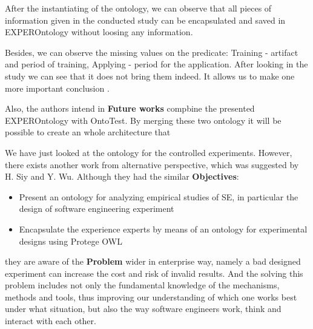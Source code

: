 	 After the instantiating of the ontology, we can observe that all pieces of information given in the conducted study can be encapsulated and saved in EXPEROntology without loosing any information.
	 
	 Besides, we can observe the missing values on the predicate: Training - artifact and period of training, Applying - period for the application. After looking in the study we can see that it does not bring them indeed. It allows us to make one more important conclusion \frqq\cite[p. 6]{Gar08}. 
	 
	 Also, the authors intend in \textbf{Future works} compbine the presented EXPEROntology with OntoTest. By merging these two ontology it will be possible to create an whole architecture that \frqq\cite[p.6]{Gar08}
	 \newline
	 
	 We have just looked at the ontology for the controlled experiments. However, there exists another work from alternative perspective, which was suggested by H. Siy and Y. Wu\cite{SiyWu12}. Although they had the similar \textbf{Objectives}:
	  \begin{itemize}
	 	\item Present an ontology for analyzing empirical studies of SE, in particular the design of software engineering experiment
	 	\item Encapsulate the experience experts by means of an ontology for experimental designs using Protege OWL
	 \end{itemize}
	they are aware of the \textbf{Problem} wider in enterprise way, namely a bad designed experiment can increase the cost and risk of invalid results. And the solving this problem includes not only the fundamental knowledge of the mechanisms, methods and tools,
	thus improving our understanding of which one works best under what situation, but also the way software engineers work, think and interact with each other.
	
